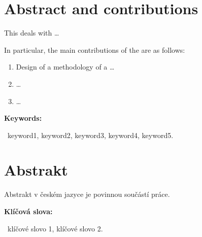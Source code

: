 \chapter*{Abstract and contributions}

This \thesis{} deals with \dots 


\bigskip
\noindent In particular, the main contributions of the \thesis{} are as follows:
\begin{enumerate}
\item
Design of a methodology of a \dots

\item
\dots

\item
\dots
\end{enumerate}


\bigskip

\noindent\textbf{Keywords:}

~keyword1, keyword2, keyword3, keyword4, keyword5.

\vfill



\chapter*{Abstrakt}


Abstrakt v {\v c}esk{\'e}m jazyce je povinnou sou{\v c}{\'a}st{\'i} práce.

\noindent\textbf{Kl{\'i}{\v c}ov{\'a} slova:}

~kl{\'i}{\v c}ov{\'e} slovo 1, kl{\'i}{\v c}ov{\'e} slovo 2.

